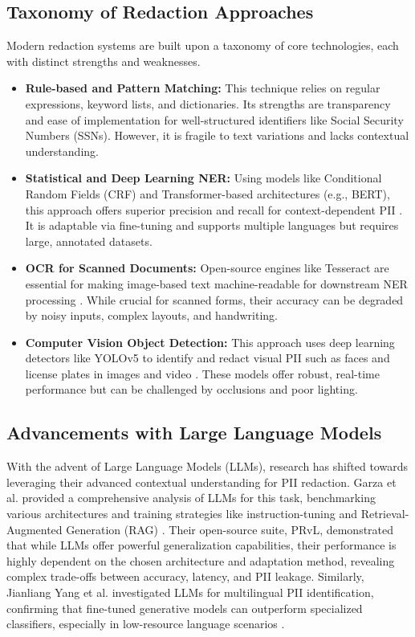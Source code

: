 \documentclass[conference]{IEEEtran}
\begin{document}
\subsection{Taxonomy of Redaction Approaches}
Modern redaction systems are built upon a taxonomy of core technologies, each with distinct strengths and weaknesses.
\begin{itemize}
    \item \textbf{Rule-based and Pattern Matching:} This technique relies on regular expressions, keyword lists, and dictionaries. Its strengths are transparency and ease of implementation for well-structured identifiers like Social Security Numbers (SSNs). However, it is fragile to text variations and lacks contextual understanding.
    \item \textbf{Statistical and Deep Learning NER:} Using models like Conditional Random Fields (CRF) and Transformer-based architectures (e.g., BERT), this approach offers superior precision and recall for context-dependent PII \cite{b1}. It is adaptable via fine-tuning and supports multiple languages but requires large, annotated datasets.
    \item \textbf{OCR for Scanned Documents:} Open-source engines like Tesseract are essential for making image-based text machine-readable for downstream NER processing \cite{b6}. While crucial for scanned forms, their accuracy can be degraded by noisy inputs, complex layouts, and handwriting.
    \item \textbf{Computer Vision Object Detection:} This approach uses deep learning detectors like YOLOv5 to identify and redact visual PII such as faces and license plates in images and video \cite{b4}. These models offer robust, real-time performance but can be challenged by occlusions and poor lighting.
\end{itemize}

\subsection{Advancements with Large Language Models}
With the advent of Large Language Models (LLMs), research has shifted towards leveraging their advanced contextual understanding for PII redaction. Garza et al. provided a comprehensive analysis of LLMs for this task, benchmarking various architectures and training strategies like instruction-tuning and Retrieval-Augmented Generation (RAG) \cite{b14}. Their open-source suite, PRvL, demonstrated that while LLMs offer powerful generalization capabilities, their performance is highly dependent on the chosen architecture and adaptation method, revealing complex trade-offs between accuracy, latency, and PII leakage. Similarly, Jianliang Yang et al. investigated LLMs for multilingual PII identification, confirming that fine-tuned generative models can outperform specialized classifiers, especially in low-resource language scenarios \cite{b8}.
\end{document}
